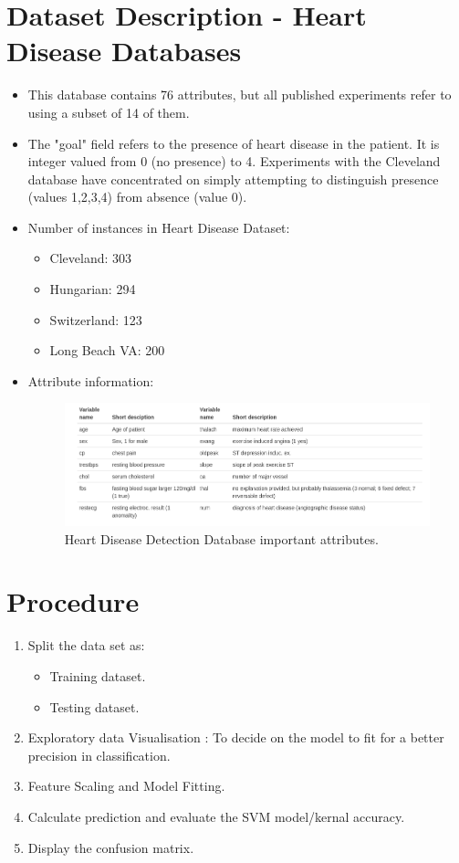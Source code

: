 \documentclass[a4paper,10pt]{article}
\begin{document}
\section{Dataset Description - Heart Disease Databases}
\begin{itemize}
	\item  This database contains 76 attributes, but all published experiments refer to using a subset of 14 of them.
	\item The "goal" field refers to the presence of heart disease
	in the patient.  It is integer valued from 0 (no presence) to 4.
	Experiments with the Cleveland database have concentrated on simply
	attempting to distinguish presence (values 1,2,3,4) from absence (value
	0).  	
\item Number of instances in Heart Disease Dataset:
	\begin{itemize}
		\item Cleveland: 303
		\item   Hungarian: 294
		\item Switzerland: 123
		\item Long Beach VA: 200
	\end{itemize}
\item Attribute information: 
\begin{figure}[h]
	\includegraphics[scale=0.55,center]{heartDiseaseDataset.png}
	\caption{Heart Disease Detection Database important attributes.}
	\label{fig:2}
\end{figure}
	
\end{itemize}
\section{Procedure}

\begin{enumerate}
	\item Split the data set as:
	\begin{itemize}
		\item Training dataset.
		\item Testing dataset.
	\end{itemize}
	\item Exploratory data Visualisation : To decide on the model to fit for a better precision in classification.
	\item Feature Scaling and Model Fitting.
	\item Calculate prediction and evaluate the SVM model/kernal accuracy.
	\item Display the confusion matrix.
\end{enumerate}	
\end{document}
